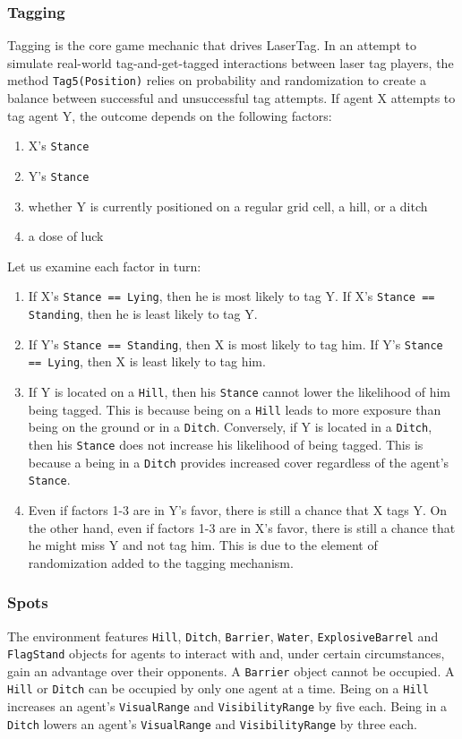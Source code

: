 \documentclass[a4paper,english,DIV=16,11pt,parskip=half,dvipsnames,listof=totoc,index=totoc,bibliography=totoc]{scrartcl}
\begin{document}
\subsubsection{Tagging} \label{sssec:tagging}
Tagging is the core game mechanic that drives LaserTag. In an attempt to simulate real-world tag-and-get-tagged interactions between laser tag players, the method \texttt{Tag5(Position)} relies on probability and randomization to create a balance between successful and unsuccessful tag attempts. If agent X attempts to tag agent Y, the outcome depends on the following factors:
%
\begin{enumerate}
  \item X's \texttt{Stance}
  \item Y's \texttt{Stance}
  \item whether Y is currently positioned on a regular grid cell, a hill, or a ditch
  \item a dose of luck
\end{enumerate}
%
Let us examine each factor in turn:
%
\begin{enumerate}
  \item If X's \texttt{Stance == Lying}, then he is most likely to tag Y. If X's \texttt{Stance == Standing}, then he is least likely to tag Y.
  \item If Y's \texttt{Stance == Standing}, then X is most likely to tag him. If Y's \texttt{Stance == Lying}, then X is least likely to tag him.
  \item If Y is located on a \texttt{Hill}, then his \texttt{Stance} cannot lower the likelihood of him being tagged. This is because being on a \texttt{Hill} leads to more exposure than being on the ground or in a \texttt{Ditch}. Conversely, if Y is located in a \texttt{Ditch}, then his \texttt{Stance} does not increase his likelihood of being tagged. This is because a being in a \texttt{Ditch} provides increased cover regardless of the agent's \texttt{Stance}.
  \item Even if factors 1-3 are in Y's favor, there is still a chance that X tags Y. On the other hand, even if factors 1-3 are in X's favor, there is still a chance that he might miss Y and not tag him. This is due to the element of randomization added to the tagging mechanism.
\end{enumerate}
%
\subsubsection{Spots} \label{sssec:spot}
The environment features \texttt{Hill}, \texttt{Ditch}, \texttt{Barrier}, \texttt{Water}, \texttt{ExplosiveBarrel} and \texttt{FlagStand} objects for agents to interact with and, under certain circumstances, gain an advantage over their opponents. A \texttt{Barrier} object cannot be occupied. A \texttt{Hill} or \texttt{Ditch} can be occupied by only one agent at a time. Being on a \texttt{Hill} increases an agent's \texttt{VisualRange} and \texttt{VisibilityRange} by five each. Being in a \texttt{Ditch} lowers an agent's \texttt{VisualRange} and \texttt{VisibilityRange} by three each.
\end{document}
